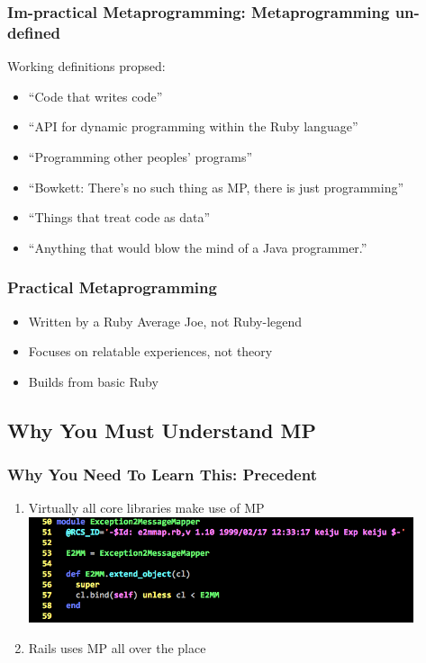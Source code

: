 \documentclass[slidestop,compress,mathserif]{beamer}
\begin{document}
\begin{frame}
	\frametitle{\textbf{Im}-practical Metaprogramming:  Metaprogramming \textbf{un}-defined}
	Working definitions propsed:
	\begin{itemize}
		\item ``Code that writes code''
		\pause
		\item ``API for dynamic programming within the Ruby language''
		\pause
		\item ``Programming other peoples' programs''
		\pause
		\item ``Bowkett:  There's no such thing as MP, there is just programming''
		\pause
		\item ``Things that treat code as data''
		\pause
		\item ``Anything that would blow the mind of a Java programmer.''
	\end{itemize}
\end{frame}

\begin{frame}
	\frametitle{Practical Metaprogramming}
	\begin{itemize}
		\pause
		\item Written by a Ruby Average Joe{\texttrademark}, not Ruby-legend
		\pause
		\item Focuses on relatable experiences, not theory
		\pause
		\item Builds from basic Ruby
	\end{itemize}
\end{frame}

\subsection{Why You Must Understand MP} %
\label{sub:benefits}

\begin{frame}
	\frametitle{Why You Need To Learn This:  Precedent}
	\begin{enumerate}
		\item Virtually all core libraries make use of MP
		\pause
		\includegraphics[scale=0.45, width=0.89\textwidth]{img/e2mmap.png}
		\pause
		\item Rails uses MP all over the place
	\end{enumerate}
\end{frame}
\end{document}
